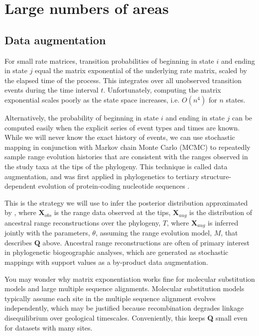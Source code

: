 \section{Large numbers of areas}

\setlength{\parindent}{0pt}

\subsection{Data augmentation}

For small rate matrices, transition probabilities of beginning in state $i$ and ending in state $j$ equal the matrix exponential of the underlying rate matrix, scaled by the elapsed time of the process.
This integrates over all unobserved transition events during the time interval $t$.
Unfortunately, computing the matrix exponential scales poorly as the state space increases, i.e. $O(n^4)$ for $n$ states.

Alternatively, the probability of beginning in state $i$ and ending in state $j$ can be computed easily when the explicit series of event types and times are known.
While we will never know the exact history of events, we can use stochastic mapping in conjunction with Markov chain Monte Carlo (MCMC) to repeatedly sample range evolution histories that are consistent with the ranges observed in the study taxa at the tips of the phylogeny.
This technique is called data augmentation, and was first applied in phylogenetics to tertiary structure-dependent evolution of protein-coding nucleotide sequences \citep{robinson03}.

This is the strategy we will use to infer the posterior distribution approximated by 
, where $\textbf{X}_{obs}$ is the range data observed at the tips, $\textbf{X}_{aug}$ is the distribution of ancestral range reconstructions over the phylogeny, $T$, where $\textbf{X}_{aug}$ is inferred jointly with the parameters, $\theta$, assuming the range evolution model, $M$, that describes $\textbf{Q}$ above.
Ancestral range reconstructions are often of primary interest in phylogenetic biogeographic analyses, which are generated as stochastic mappings with support values as a by-product data augmentation.

You may wonder why matrix exponentiation works fine for molecular substitution models and large multiple sequence alignments.
Molecular substitution models typically assume each site in the multiple sequence alignment evolves independently, which may be justified because recombination degrades linkage disequilibrium over geological timescales.
Conveniently, this keeps \textbf{Q} small even for datasets with many sites.


